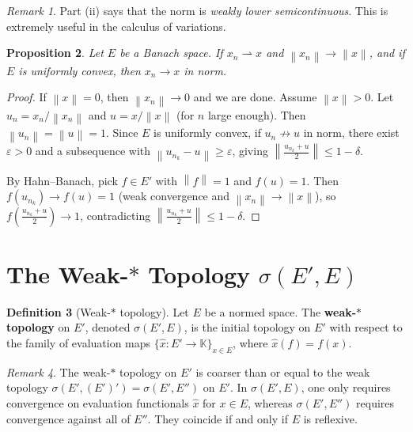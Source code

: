 \documentclass[a4paper,12pt]{book}
\newcommand{\K}{\mathbb{K}}
\newcommand{\norm}[1]{\left\| #1 \right\|}
\newcommand{\weakto}{\rightharpoonup}
\theoremstyle{definition}
\newtheorem{definition}{Definition}[chapter]
\theoremstyle{plain}
\newtheorem{proposition}[definition]{Proposition}
\theoremstyle{remark}
\newtheorem{remark}[definition]{Remark}
\begin{document}
\begin{remark}\label{rem:weak-lsc}
Part (ii) says that the norm is \emph{weakly lower semicontinuous}.
This is extremely useful in the calculus of variations.
\end{remark}

\begin{proposition}\label{prop:weak-plus-norm-convergence}
Let $E$ be a Banach space.  If $x_n\weakto x$ and $\norm{x_n}\to\norm{x}$,
and if $E$ is uniformly convex, then $x_n\to x$ in norm.
\end{proposition}

\begin{proof}
If $\norm{x}=0$, then $\norm{x_n}\to 0$ and we are done.
Assume $\norm{x}>0$.  Let $u_n = x_n/\norm{x_n}$ and $u=x/\norm{x}$ (for
$n$ large enough).  Then $\norm{u_n}=\norm{u}=1$.  Since $E$ is uniformly
convex, if $u_n\not\to u$ in norm, there exist $\varepsilon>0$ and a
subsequence with $\norm{u_{n_k}-u}\ge\varepsilon$, giving
$\norm{\frac{u_{n_k}+u}{2}}\le 1-\delta$.

By Hahn--Banach, pick $f\in E'$ with $\norm{f}=1$ and $f(u)=1$.  Then
$f(u_{n_k})\to f(u) = 1$ (weak convergence and $\norm{x_n}\to\norm{x}$), so
$f(\frac{u_{n_k}+u}{2})\to 1$, contradicting
$\norm{\frac{u_{n_k}+u}{2}}\le 1-\delta$.
\end{proof}

\section{The Weak-\texorpdfstring{$*$}{*} Topology
\texorpdfstring{$\sigma(E',E)$}{sigma(E',E)}}%
\label{sec:weak-star-topology}

\begin{definition}[Weak-$*$ topology]\label{def:weak-star}
Let $E$ be a normed space.  The \textbf{weak-$*$ topology} on $E'$, denoted
$\sigma(E',E)$, is the initial topology on $E'$ with respect to the family
of evaluation maps $\{\hat{x}: E'\to\K\}_{x\in E}$, where
$\hat{x}(f)=f(x)$.
\end{definition}

\begin{remark}\label{rem:weak-star-vs-weak}
The weak-$*$ topology on $E'$ is coarser than or equal to the weak topology
$\sigma(E',(E')')=\sigma(E',E'')$ on $E'$.  In $\sigma(E',E)$, one only
requires convergence on evaluation functionals $\hat{x}$ for $x\in E$,
whereas $\sigma(E',E'')$ requires convergence against all of $E''$.
They coincide if and only if $E$ is reflexive.
\end{remark}
\end{document}
